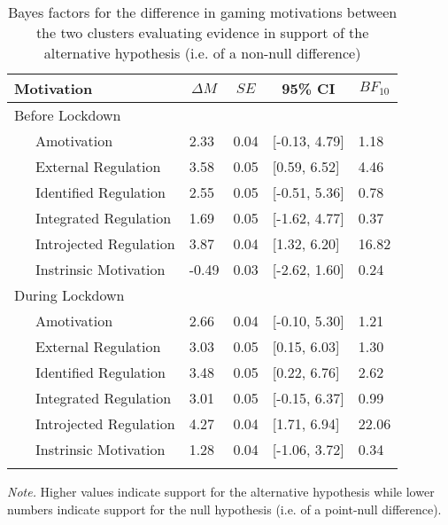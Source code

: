 \documentclass[
  english,
  jou,floatsintext]{apa6}
\begin{document}
\begin{table*}[tbp]

\begin{center}
\begin{threeparttable}

\caption{\label{tab:motivation-change-clusts}Bayes factors for the difference in gaming motivations between the two clusters evaluating evidence in support of the alternative hypothesis (i.e. of a non-null difference)}

\begin{tabular}{lllll}
\toprule
Motivation & \multicolumn{1}{c}{$\Delta{M}$} & \multicolumn{1}{c}{$SE$} & \multicolumn{1}{c}{95\% CI} & \multicolumn{1}{c}{$BF_{10}$}\\
\midrule
Before Lockdown &  &  &  & \\
\ \ \ Amotivation & 2.33 & 0.04 & [-0.13, 4.79] & 1.18\\
\ \ \ External Regulation & 3.58 & 0.05 & [0.59, 6.52] & 4.46\\
\ \ \ Identified Regulation & 2.55 & 0.05 & [-0.51, 5.36] & 0.78\\
\ \ \ Integrated Regulation & 1.69 & 0.05 & [-1.62, 4.77] & 0.37\\
\ \ \ Introjected Regulation & 3.87 & 0.04 & [1.32, 6.20] & 16.82\\
\ \ \ Instrinsic Motivation & -0.49 & 0.03 & [-2.62, 1.60] & 0.24\\
During Lockdown &  &  &  & \\
\ \ \ Amotivation & 2.66 & 0.04 & [-0.10, 5.30] & 1.21\\
\ \ \ External Regulation & 3.03 & 0.05 & [0.15, 6.03] & 1.30\\
\ \ \ Identified Regulation & 3.48 & 0.05 & [0.22, 6.76] & 2.62\\
\ \ \ Integrated Regulation & 3.01 & 0.05 & [-0.15, 6.37] & 0.99\\
\ \ \ Introjected Regulation & 4.27 & 0.04 & [1.71, 6.94] & 22.06\\
\ \ \ Instrinsic Motivation & 1.28 & 0.04 & [-1.06, 3.72] & 0.34\\
\bottomrule
\addlinespace
\end{tabular}

\begin{tablenotes}[para]
\normalsize{\textit{Note.} Higher values indicate support for the alternative hypothesis while lower numbers indicate support for the null hypothesis (i.e. of a point-null difference).}
\end{tablenotes}

\end{threeparttable}
\end{center}

\end{table*}
\end{document}
